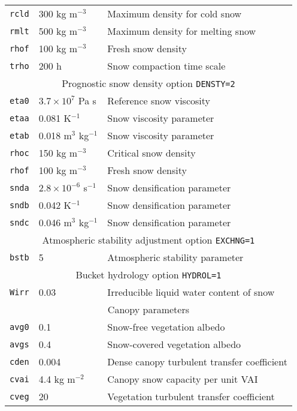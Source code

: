 \documentclass{article}
\begin{document}
\begin{tabular}{|l|l|l|}
\hline 
{\tt rcld} & 300 kg m$^{-3}$ & Maximum density for cold snow    \\
{\tt rmlt} & 500 kg m$^{-3}$ & Maximum density for melting snow \\
{\tt rhof} & 100 kg m$^{-3}$ & Fresh snow density               \\
{\tt trho} & 200 h           & Snow compaction time scale       \\
\hline
\hline
\multicolumn{3}{|c|}{Prognostic snow density option {\tt DENSTY=2}} \\
\hline 
{\tt eta0} & $3.7 \times 10^7$ Pa s        & Reference snow viscosity     \\
{\tt etaa} & 0.081 K$^{-1}$                & Snow viscosity parameter     \\
{\tt etab} & 0.018 m$^3$ kg$^{-1}$         & Snow viscosity parameter     \\
{\tt rhoc} & 150 kg m$^{-3}$               & Critical snow density        \\
{\tt rhof} & 100 kg m$^{-3}$               & Fresh snow density           \\
{\tt snda} & $2.8 \times 10^{-6}$ s$^{-1}$ & Snow densification parameter \\
{\tt sndb} & 0.042 K$^{-1}$                & Snow densification parameter \\
{\tt sndc} & 0.046 m$^3$ kg$^{-1}$         & Snow densification parameter \\
\hline 
\hline
\multicolumn{3}{|c|}{Atmospheric stability adjustment option {\tt EXCHNG=1}} \\
\hline 
{\tt bstb} & 5 & Atmospheric stability parameter                               \\
\hline
\hline 
\multicolumn{3}{|c|}{Bucket hydrology option {\tt HYDROL=1}} \\
\hline
{\tt Wirr} & 0.03 & Irreducible liquid water content of snow   \\
\hline
\hline
\multicolumn{3}{|c|}{Canopy parameters} \\
\hline
{\tt avg0} & 0.1             & Snow-free vegetation albedo                  \\
{\tt avgs} & 0.4             & Snow-covered vegetation albedo               \\ 
{\tt cden} & 0.004           & Dense canopy turbulent transfer coefficient  \\
{\tt cvai} & 4.4 kg m$^{-2}$ & Canopy snow capacity per unit VAI            \\
{\tt cveg} & 20              & Vegetation turbulent transfer coefficient    \\

\end{tabular}
\end{document}

